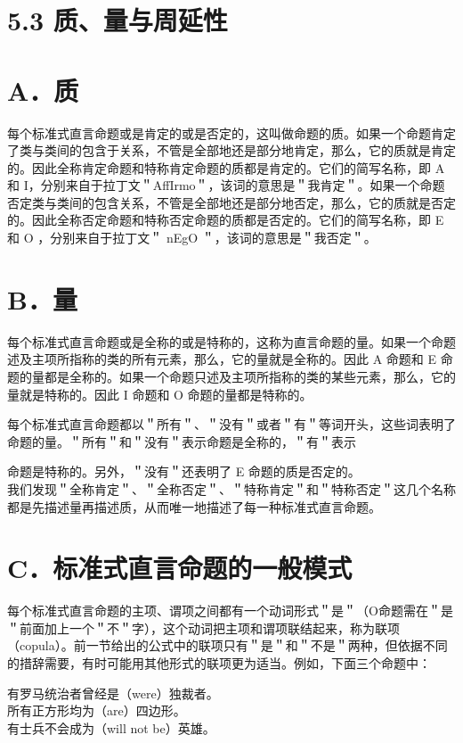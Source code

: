 \section*{5.3 质、量与周延性}
\section*{A．质}
每个标准式直言命题或是肯定的或是否定的，这叫做命题的质。如果一个命题肯定了类与类间的包含于关系，不管是全部地还是部分地肯定，那么，它的质就是肯定的。因此全称肯定命题和特称肯定命题的质都是肯定的。它们的简写名称，即 A 和 I，分别来自于拉丁文＂AffIrmo＂，该词的意思是＂我肯定＂。如果一个命题否定类与类间的包含关系，不管是全部地还是部分地否定，那么，它的质就是否定的。因此全称否定命题和特称否定命题的质都是否定的。它们的简写名称，即 E 和 O ，分别来自于拉丁文＂ nEgO ＂，该词的意思是＂我否定＂。

\section*{B．量}
每个标准式直言命题或是全称的或是特称的，这称为直言命题的量。如果一个命题述及主项所指称的类的所有元素，那么，它的量就是全称的。因此 A 命题和 E 命题的量都是全称的。如果一个命题只述及主项所指称的类的某些元素，那么，它的量就是特称的。因此 I 命题和 O 命题的量都是特称的。

每个标准式直言命题都以＂所有＂、＂没有＂或者＂有＂等词开头，这些词表明了命题的量。＂所有＂和＂没有＂表示命题是全称的，＂有＂表示

命题是特称的。另外，＂没有＂还表明了 E 命题的质是否定的。\\
我们发现＂全称肯定＂、＂全称否定＂、＂特称肯定＂和＂特称否定＂这几个名称都是先描述量再描述质，从而唯一地描述了每一种标准式直言命题。

\section*{C．标准式直言命题的一般模式}
每个标准式直言命题的主项、谓项之间都有一个动词形式＂是＂（O命题需在＂是＂前面加上一个＂不＂字），这个动词把主项和谓项联结起来，称为联项（copula）。前一节给出的公式中的联项只有＂是＂和＂不是＂两种，但依据不同的措辞需要，有时可能用其他形式的联项更为适当。例如，下面三个命题中：

\begin{displayquote}
有罗马统治者曾经是（were）独裁者。\\
所有正方形均为（are）四边形。\\
有士兵不会成为（will not be）英雄。
\end{displayquote}

